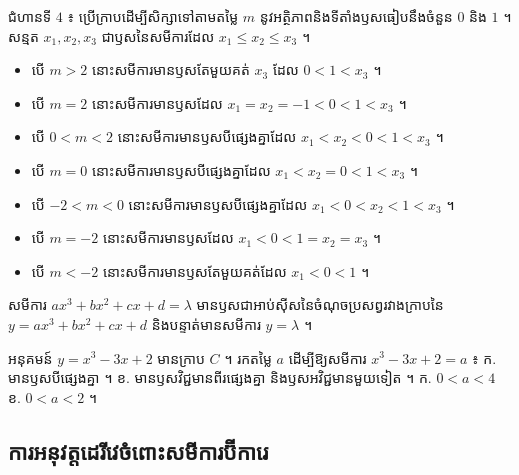 ជំហានទី $4$ ៖ ប្រើក្រាបដើម្បីសិក្សាទៅតាមតម្លៃ $m$ នូវអត្ថិភាពនិងទីតាំងឫសធៀបនឹងចំនួន $0$ និង $1$ ។ សន្មត $x_1, x_2, x_3$ ជាឫសនៃសមីការដែល $x_1 \le x_2 \le x_3$ ។
\begin{itemize}
  \item បើ $m > 2$ នោះសមីការមានឫសតែមួយគត់ $x_3$ ដែល $0 < 1 < x_3$ ។
  \item បើ $m = 2$ នោះសមីការមានឫសដែល $x_1 = x_2 = -1 < 0 < 1 < x_3$ ។
  \item បើ $0 < m < 2$ នោះសមីការមានឫសបីផ្សេងគ្នាដែល $x_1 < x_2 < 0 < 1 < x_3$ ។
  \item បើ $m = 0$ នោះសមីការមានឫសបីផ្សេងគ្នាដែល $x_1 < x_2 = 0 < 1 < x_3$ ។
  \item បើ $-2 < m < 0$ នោះសមីការមានឫសបីផ្សេងគ្នាដែល $x_1 < 0 < x_2 < 1 < x_3$ ។
  \item បើ $m = -2$ នោះសមីការមានឫសដែល $x_1 < 0 < 1 = x_2 = x_3$ ។
  \item បើ $m < -2$ នោះសមីការមានឫសតែមួយគត់ដែល $x_1 < 0 < 1$ ។
\end{itemize}

\begin{formulaBox}[ជាទូទៅ]
សមីការ $ax^3 + bx^2 + cx + d = \lambda$ មានឫសជាអាប់ស៊ីសនៃចំណុចប្រសព្វរវាងក្រាបនៃ $y = ax^3 + bx^2 + cx + d$ និងបន្ទាត់មានសមីការ $y = \lambda$ ។
\end{formulaBox}

\begin{pro}
អនុគមន៍ $y = x^3 - 3x + 2$ មានក្រាប $C$ ។ រកតម្លៃ $a$ ដើម្បីឱ្យសមីការ $x^3 - 3x + 2 = a$ ៖ \quad ក. មានឫសបីផ្សេងគ្នា ។ \quad ខ. មានឫសវិជ្ជមានពីរផ្សេងគ្នា និងឫសអវិជ្ជមានមួយទៀត ។
\ans
ក. $0 < a < 4$ \quad ខ. $0 < a < 2$ ។
\end{pro}

\subsection{ការអនុវត្តដេរីវេចំពោះសមីការប៊ីការេ}

